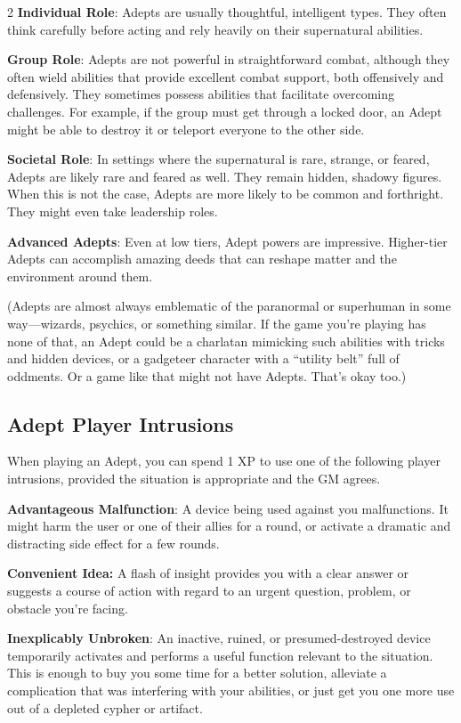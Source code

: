 \begin{multicols}{2}
\textbf{Individual Role}: Adepts are usually thoughtful, intelligent types. They often think carefully before acting and rely heavily on their supernatural abilities.

\textbf{Group Role}: Adepts are not powerful in straightforward combat, although they often wield abilities that provide excellent combat support, both offensively and defensively. They sometimes possess abilities that facilitate overcoming challenges. For example, if the group must get through a locked door, an Adept might be able to destroy it or teleport everyone to the other side. 

\textbf{Societal Role}: In settings where the supernatural is rare, strange, or feared, Adepts are likely rare and feared as well. They remain hidden, shadowy figures. When this is not the case, Adepts are more likely to be common and forthright. They might even take leadership roles.

\textbf{Advanced Adepts}: Even at low tiers, Adept powers are impressive. Higher-tier Adepts can accomplish amazing deeds that can reshape matter and the environment around them.

(Adepts are almost always emblematic of the paranormal or superhuman in some way—wizards, psychics, or something similar. If the game you’re playing has none of that, an Adept could be a charlatan mimicking such abilities with tricks and hidden devices, or a gadgeteer character with a “utility belt” full of oddments. Or a game like that might not have Adepts. That’s okay too.)

\subsection{Adept Player Intrusions}

When playing an Adept, you can spend 1 XP to use one of the following player intrusions, provided the situation is appropriate and the GM agrees.

\textbf{Advantageous Malfunction}: A device being used against you malfunctions. It might harm the user or one of their allies for a round, or activate a dramatic and distracting side effect for a few rounds.

\textbf{Convenient Idea:} A flash of insight provides you with a clear answer or suggests a course of action with regard to an urgent question, problem, or obstacle you’re facing.

\textbf{Inexplicably Unbroken}: An inactive, ruined, or presumed-destroyed device temporarily activates and performs a useful function relevant to the situation. This is enough to buy you some time for a better solution, alleviate a complication that was interfering with your abilities, or just get you one more use out of a depleted cypher or artifact.


\end{multicols}
